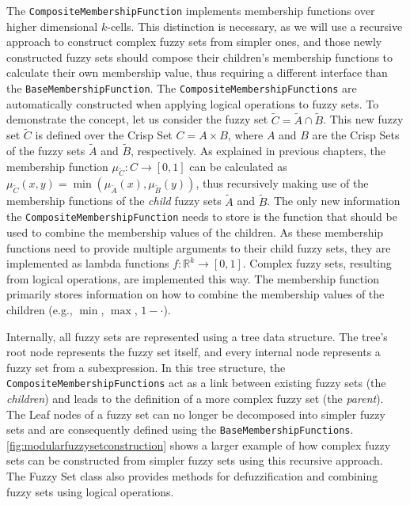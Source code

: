 \begin{itemize}
        The \texttt{CompositeMembershipFunction} implements membership functions over higher dimensional $k$-cells. This distinction is necessary, as we will use a recursive approach to construct complex fuzzy sets from simpler ones, and those newly constructed fuzzy sets should compose their children's membership functions to calculate their own membership value, thus requiring a different interface than the \texttt{BaseMembershipFunction}. The \texttt{CompositeMembershipFunctions} are automatically constructed when applying logical operations to fuzzy sets. To demonstrate the concept, let us consider the fuzzy set $\tilde{C} = \tilde{A} \cap \tilde{B}$. This new fuzzy set $\tilde{C}$ is defined over the Crisp Set $C = A \times B$, where $A$ and $B$ are the Crisp Sets of the fuzzy sets $\tilde{A}$ and $\tilde{B}$, respectively. As explained in previous chapters, the membership function $\mu_{\tilde{C}} : C \rightarrow [0, 1]$ can be calculated as $\mu_{\tilde{C}}(x, y) = \min(\mu_{\tilde{A}}(x), \mu_{\tilde{B}}(y))$, thus recursively making use of the membership functions of the \emph{child} fuzzy sets $\tilde{A}$ and $\tilde{B}$. The only new information the \texttt{CompositeMembershipFunction} needs to store is the function that should be used to combine the membership values of the children. As these membership functions need to provide multiple arguments to their child fuzzy sets, they are implemented as lambda functions $f: \mathbb{R}^k \rightarrow [0, 1]$. Complex fuzzy sets, resulting from logical operations, are implemented this way. The membership function primarily stores information on how to combine the membership values of the children (e.g., $\min$, $\max$, $1 - \cdot$).

        Internally, all fuzzy sets are represented using a tree data structure. The tree's root node represents the fuzzy set itself, and every internal node represents a fuzzy set from a subexpression. In this tree structure, the \texttt{CompositeMembershipFunctions} act as a link between existing fuzzy sets (the \emph{children}) and leads to the definition of a more complex fuzzy set (the \emph{parent}). The Leaf nodes of a fuzzy set can no longer be decomposed into simpler fuzzy sets and are consequently defined using the \texttt{BaseMembershipFunctions}.
        \autoref{fig:modularfuzzysetconstruction} shows a larger example of how complex fuzzy sets can be constructed from simpler fuzzy sets using this recursive approach.
        The Fuzzy Set class also provides methods for defuzzification and combining fuzzy sets using logical operations.


\end{itemize}
